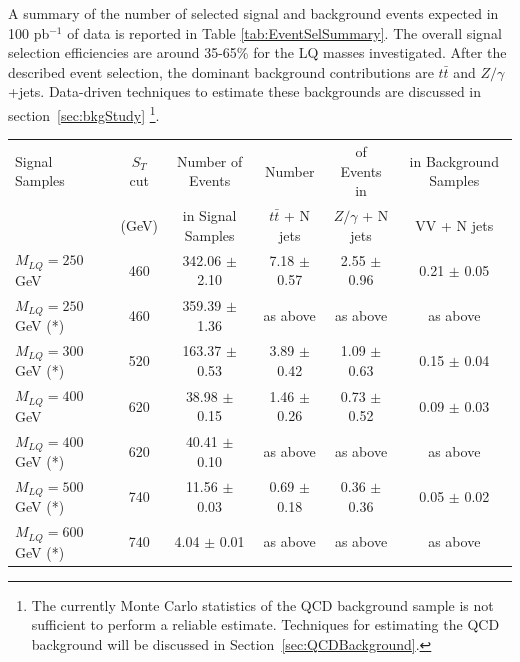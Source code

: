 A summary of the number of selected signal and background events expected in 100 pb$^{-1}$ of data 
is reported in Table \ref{tab:EventSelSummary}. 
The overall signal selection efficiencies are around 35-65\% for the LQ masses investigated. 
After the described event selection, the dominant background contributions 
are $t\bar{t}$ and $Z/\gamma$+jets. Data-driven techniques to estimate these backgrounds
are discussed in section~\ref{sec:bkgStudy} \footnote{The currently Monte Carlo statistics of the QCD background sample
is not sufficient to perform a reliable estimate. Techniques for estimating the QCD background will be discussed in 
Section~\ref{sec:QCDBackground}.}.

\begin{table}[htbp]
\begin{center}
\begin{tabular}{|lcc||ccc|}
\hline\hline
Signal Samples       & $S_T$ cut       & Number of Events     & Number              & of Events in        & in Background Samples     \\
                     & (GeV)           & in Signal Samples    & $t\bar{t}$ + N jets & $Z/\gamma$ + N jets & VV + N jets               \\ 
\hline
$M_{LQ}=250~$GeV     & 460             & 342.06 $\pm$ 2.10    & 7.18  $\pm$ 0.57    & 2.55  $\pm$ 0.96    & 0.21 $\pm$ 0.05 \\ 
$M_{LQ}=250~$GeV (*) & 460             & 359.39 $\pm$ 1.36    & as above            & as above            & as above        \\
$M_{LQ}=300~$GeV (*) & 520             & 163.37 $\pm$ 0.53    & 3.89  $\pm$ 0.42    & 1.09  $\pm$ 0.63    & 0.15 $\pm$ 0.04 \\ 
$M_{LQ}=400~$GeV     & 620             &  38.98 $\pm$ 0.15    & 1.46  $\pm$ 0.26    & 0.73  $\pm$ 0.52    & 0.09 $\pm$ 0.03 \\ 
$M_{LQ}=400~$GeV (*) & 620             &  40.41 $\pm$ 0.10    & as above            & as above            & as above        \\
$M_{LQ}=500~$GeV (*) & 740             &  11.56 $\pm$ 0.03    & 0.69  $\pm$ 0.18    & 0.36  $\pm$ 0.36    & 0.05 $\pm$ 0.02 \\ 
$M_{LQ}=600~$GeV (*) & 740             &   4.04 $\pm$ 0.01    & as above            & as above            & as above        \\

\end{tabular}
\end{center}
\end{table}
